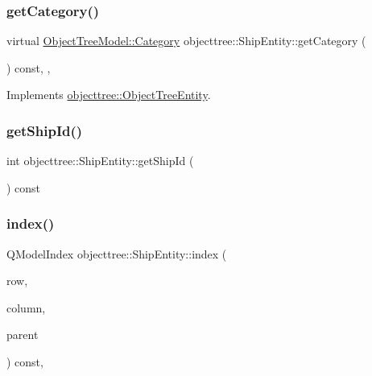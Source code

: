 \mbox{\label{classobjecttree_1_1_ship_entity_a1d9cd40e6965ab6bf90e4a7953907224}} 
\subsubsection{\texorpdfstring{getCategory()}{getCategory()}}
{\footnotesize\ttfamily virtual \mbox{\hyperlink{class_object_tree_model_a379e9d6b0d381853785adf62095ba4e3}{Object\+Tree\+Model\+::\+Category}} objecttree\+::\+Ship\+Entity\+::get\+Category (\begin{DoxyParamCaption}{ }\end{DoxyParamCaption}) const\hspace{0.3cm}{\ttfamily [inline]}, {\ttfamily [override]}, {\ttfamily [virtual]}}



Implements \mbox{\hyperlink{classobjecttree_1_1_object_tree_entity_aa4e80e7fa80672c1b9902add665abc77}{objecttree\+::\+Object\+Tree\+Entity}}.

\mbox{\label{classobjecttree_1_1_ship_entity_a9493004c5dfe0a9ecd8362e3eefc17e9}} 
\subsubsection{\texorpdfstring{getShipId()}{getShipId()}}
{\footnotesize\ttfamily int objecttree\+::\+Ship\+Entity\+::get\+Ship\+Id (\begin{DoxyParamCaption}{ }\end{DoxyParamCaption}) const\hspace{0.3cm}{\ttfamily [inline]}}

\mbox{\label{classobjecttree_1_1_ship_entity_ad72753eef565dec48ce6a4b8fcd07c4e}} 
\subsubsection{\texorpdfstring{index()}{index()}}
{\footnotesize\ttfamily Q\+Model\+Index objecttree\+::\+Ship\+Entity\+::index (\begin{DoxyParamCaption}\item[{int}]{row,  }\item[{int}]{column,  }\item[{const Q\+Model\+Index \&}]{parent }\end{DoxyParamCaption}) const\hspace{0.3cm}{\ttfamily [override]}, {\ttfamily [virtual]}}



